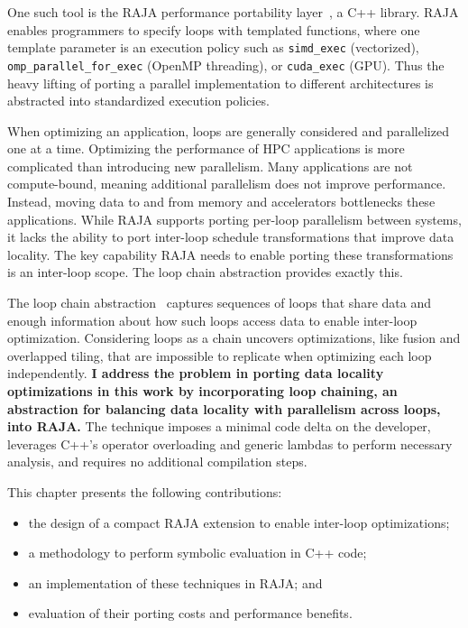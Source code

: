 One such tool is the RAJA performance portability layer~\cite{hornung2014RAJA}, a C++ library.
RAJA enables programmers to specify loops with templated functions,
where one template parameter is an execution policy such as 
\verb.simd_exec. (vectorized), \verb.omp_parallel_for_exec. (OpenMP threading), or \verb.cuda_exec. (GPU).
Thus the heavy lifting of porting a parallel implementation to different 
architectures is abstracted into standardized execution policies.


When optimizing an application, loops are generally considered and
parallelized one at a time.
Optimizing the performance of HPC applications is more complicated than introducing new parallelism.
Many applications are not compute-bound, meaning additional parallelism does not improve performance. 
Instead, moving data to and from memory and accelerators bottlenecks these applications. 
While RAJA supports porting per-loop parallelism between systems, it lacks the ability to port inter-loop schedule transformations that improve data locality. 
The key capability RAJA needs to enable porting these transformations is an inter-loop scope.
The loop chain abstraction provides exactly this.

The loop chain abstraction~\cite{krieger2013loop} captures sequences of loops that share 
data and enough information about how such loops access 
data to enable inter-loop optimization.
Considering loops as a chain uncovers optimizations, like fusion
and overlapped tiling, that are impossible to replicate when optimizing
each loop independently.
\textbf{I address the problem in porting data locality optimizations in this
work by incorporating loop chaining, an abstraction for balancing data locality
with parallelism across loops, into RAJA.}
The technique imposes a minimal code delta on the developer, leverages C++'s
operator overloading and generic lambdas to perform necessary analysis, and
requires no additional compilation steps.

This chapter presents the following contributions:
\begin{itemize}
\item the design of a compact RAJA extension to enable inter-loop
			optimizations;
\item a methodology to perform symbolic evaluation in C++ code;
\item an implementation of these techniques in RAJA\@; and
\item evaluation of their porting costs and performance benefits.
\end{itemize}

